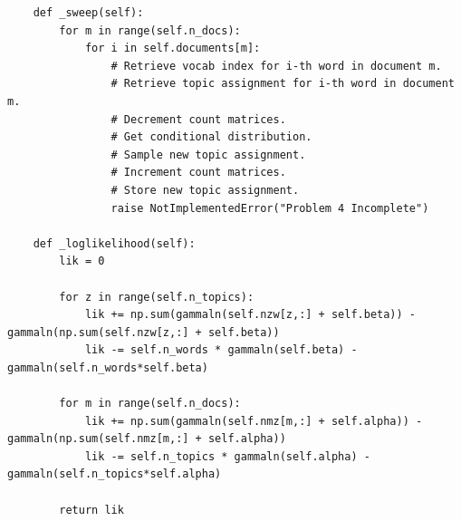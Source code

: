 \begin{lstlisting}
    def _sweep(self):
        for m in range(self.n_docs):
            for i in self.documents[m]:
                # Retrieve vocab index for i-th word in document m.
                # Retrieve topic assignment for i-th word in document m.
                # Decrement count matrices.
                # Get conditional distribution.
                # Sample new topic assignment.
                # Increment count matrices.
                # Store new topic assignment.
                raise NotImplementedError("Problem 4 Incomplete")

    def _loglikelihood(self):
        lik = 0

        for z in range(self.n_topics):
            lik += np.sum(gammaln(self.nzw[z,:] + self.beta)) - gammaln(np.sum(self.nzw[z,:] + self.beta))
            lik -= self.n_words * gammaln(self.beta) - gammaln(self.n_words*self.beta)

        for m in range(self.n_docs):
            lik += np.sum(gammaln(self.nmz[m,:] + self.alpha)) - gammaln(np.sum(self.nmz[m,:] + self.alpha))
            lik -= self.n_topics * gammaln(self.alpha) - gammaln(self.n_topics*self.alpha)

        return lik
\end{lstlisting}

